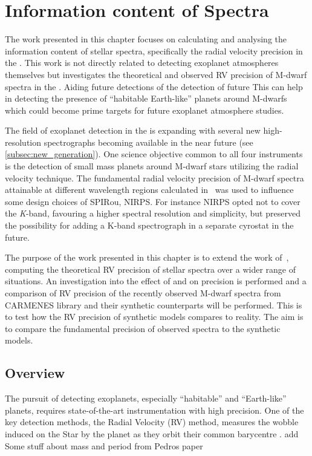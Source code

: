 
\chapter{Information content of \nir{} Spectra}
\label{cha:nir_content}

The work presented in this chapter focuses on calculating and analysing the information content of stellar spectra, specifically the radial velocity precision in the \nir{}.
This work is not directly related to detecting exoplanet atmospheres themselves but investigates the theoretical and observed {RV} precision of {M-dwarf} spectra in the \nir{}.
Aiding future detections of the detection of future
This can help in detecting the presence of ``habitable Earth-like'' planets around {M-dwarfs} which could become prime targets for future exoplanet atmosphere studies.

The field of exoplanet detection in the \nir{} is expanding with several new high-resolution \nir{} spectrographs becoming available in the near future (see \cref{subsec:new_generation}).
One science objective common to all four instruments is the detection of small mass planets around {M-dwarf} stars utilizing the radial velocity technique.
The fundamental radial velocity precision of {M-dwarf} spectra attainable at different wavelength regions calculated in~\citet{figueira_radial_2016} was used to influence some design choices of {SPIRou}, {NIRPS}.
For instance {NIRPS} opted not to cover the \emph{K}-band, favouring a higher spectral resolution and simplicity, but preserved the possibility for adding a K-band spectrograph in a separate cyrostat in the future.

The purpose of the work presented in this chapter is to extend the work of~\citet{figueira_radial_2016}, computing the theoretical {RV} precision of stellar spectra over a wider range of situations.
An investigation into the effect of \logg{} and \feh{} on precision is performed and a comparison of {RV} precision of the recently observed \nir{} {M-dwarf} spectra from {CARMENES} library and their synthetic counterparts will be performed.
This is to test how the {RV} precision of synthetic models compares to reality.
The aim is to compare the fundamental precision of observed \nir{} spectra to the synthetic models.


\section{Overview}
The pursuit of detecting exoplanets, especially ``habitable'' and ``Earth-like'' planets, requires state-of-the-art instrumentation with high precision.
One of the key detection methods, the Radial Velocity ({RV}) method, measures the wobble induced on the Star by the planet as they orbit their common barycentre .
{\red{} add Some stuff about mass and period from Pedros paper}  


